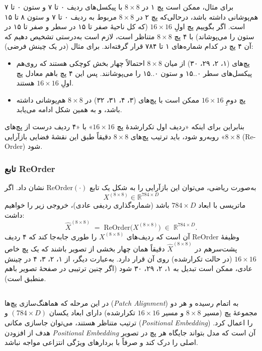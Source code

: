 برای مثال، ممکن است پچ ۱ در $8 \times 8$ با پیکسل‌های ردیف ۰ تا ۷ و ستون ۰ تا ۷ هم‌پوشانی داشته باشد، درحالی‌که پچ ۲ در $8 \times 8$ مربوط به ردیف ۰ تا ۷ و ستون ۸ تا ۱۵ است. اگر بگوییم پچ اولِ $16 \times 16$ (که کل ناحیهٔ صفر تا ۱۵ در سطر و صفر تا ۱۵ در ستون را می‌پوشاند) با ۴ پچ $8 \times 8$ متناظر است، لازم است به‌درستی تشخیص دهیم که آن ۴ پچ در کدام شماره‌های ۱ تا ۷۸۴ قرار گرفته‌اند. برای مثال (در یک چینش فرضی):
\begin{itemize}
	\item پچ‌های (۱، ۲، ۲۹، ۳۰) از میان $8 \times 8$ احتمالاً چهار بخش کوچکی هستند که روی‌هم پیکسل‌های سطر ۰..۱۵ و ستون ۰..۱۵ را می‌پوشانند. پس این ۴ پچ باهم معادل پچ اولِ $16 \times 16$ هستند.
	\item پچ دومِ $16 \times 16$ ممکن است با پچ‌های (۳، ۴، ۳۱، ۳۲) در $8 \times 8$ هم‌پوشانی داشته باشد، و به همین شکل ادامه می‌یابد.
\end{itemize}
بنابراین برای اینکه «ردیف اول تکرارشدهٔ پچ $16 \times 16$» با «۴ ردیف درست از پچ‌های $8 \times 8$» روبه‌رو شود، باید ترتیب پچ‌های $8 \times 8$ دقیقاً طبق این نقشهٔ فضایی بازآرایی (Re-Order) شود.

\subsubsection*{تابع ReOrder}
به‌صورت ریاضی، می‌توان این بازآرایی را به شکل یک تابع
\(\mathrm{ReOrder}(\cdot)\)
نشان داد. اگر 
\[
X^{(8\times8)} \in \mathbb{R}^{784 \times D}
\]
ماتریسی با ابعاد $784 \times D$ باشد (شماره‌گذاری ردیفی عادی)، خروجی زیر را خواهیم داشت:
\[
\hat{X}^{(8\times8)} \;=\; \mathrm{ReOrder}\bigl(X^{(8\times8)}\bigr)\;\in\;\mathbb{R}^{784 \times D}.
\]
وظیفهٔ \(\mathrm{ReOrder}\) آن است که ردیف‌های 
\(X^{(8\times8)}\)
را طوری جابه‌جا کند که ۴ ردیف پشت‌سرهم در 
\(\hat{X}^{(8\times8)}\)
دقیقاً همان چهار بخشی از تصویر باشند که یک پچ خاص $16 \times 16$ (در حالت تکرارشده) روی آن قرار دارد. به‌عبارت دیگر، از ۱، ۲، ۳، ۴ در چینش عادی، ممکن است تبدیل به ۱، ۲، ۲۹، ۳۰ شود (اگر چنین ترتیبی در صفحهٔ تصویر باهم منطبق است).


\subsection{}

در این مرحله که هماهنگ‌سازی پچ‌ها (\textit{Patch Alignment}) به اتمام رسیده و هر دو مجموعهٔ پچ (مسیر $8 \times 8$ و مسیر $16 \times 16$ تکرارشده) دارای ابعاد یکسان \((784 \times D)\) و ترتیب متناظر هستند، می‌توان جاسازی مکانی (\textit{Positional Embedding}) را اعمال کرد. هدف از افزودن \textit{Positional Embedding} آن است که مدل بتواند جایگاه هر پچ در تصویر اصلی را درک کند و صرفاً با بردارهای ویژگی انتزاعی مواجه نباشد.

